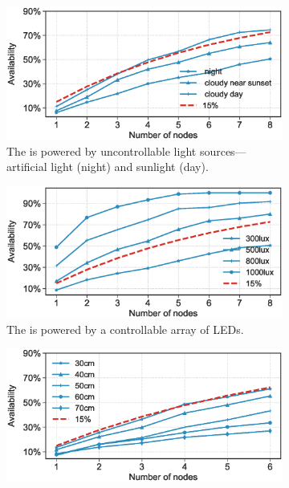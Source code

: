 \begin{figure}[h]
        \begin{subfigure}{.66\columnwidth}
            \includegraphics[width=\textwidth]{figures/sysAvailability}
                \caption{The \cis is powered by uncontrollable light sources---artificial light (night) and sunlight (day).}
            \label{fig:solarPwrCIS}
        \end{subfigure}\hfill
        \begin{subfigure}{.66\columnwidth}
            \includegraphics[width=\textwidth]{figures/sysAvailability_artificial-light}
                \caption{The \cis is powered by a controllable array of LEDs. \vspace{1em}}
            \label{fig:artPwrCIS}
        \end{subfigure}\hfill
        \begin{subfigure}{.66\columnwidth}
            \includegraphics[width=\textwidth]{figures/rf_sysAvailability}

\end{subfigure}
\end{figure}
